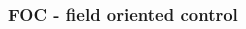 \documentclass{beamer}
\begin{document}
\begin{frame}
  
  \frametitle{\bf FOC - field oriented control}
  

  \begin{columns}

    \begin{column}{0.5\textwidth}
    \end{column}


\end{columns}
\end{frame}
\end{document}
